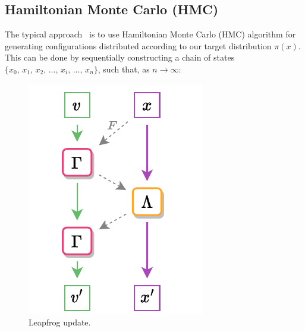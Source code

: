 \documentclass[a4paper,11pt]{article}
\begin{document}
\subsection{Hamiltonian Monte Carlo (HMC)}
\label{subsec:hmc}
%
The typical approach~\cite{foreman_deep_2021,foreman_leapfroglayers_2022} is to use 
%
Hamiltonian Monte Carlo (HMC) algorithm for generating configurations 
%
distributed according to our target distribution $\pi(x)$.
%
This can be done by sequentially constructing a chain of states $\{x_{0},\, x_{1},\, x_{2},\, \ldots,\, x_{i},\, \ldots,\, x_{n}\}$, such that, as $n \rightarrow \infty$:
%
%
\begin{figure}
  \begin{center}
  \caption{\label{fig:hmc-update}Leapfrog update.}
  \includegraphics[width=\linewidth]{assets/hmc-update11.pdf}
  \end{center}
\end{figure}
\end{document}

